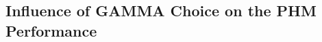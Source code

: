 \begin{comment}
\begin{figure}[H]
  \centering
  \texttt{[image: accuracy\_real\_world]}
  \caption {Source and Target Accuracies for model training with Regular FC + CNN MMD-loss (left), Regular FC MMD (middle) and No MMD-loss (right)} \label{fig:accuracy_real_world}
\end{figure}


\begin{figure}[H]
  \centering
  \texttt{[image: loss\_real\_world]}
  \caption {Loss for model training with Regular FC + CNN MMD-loss (left), Regular FC MMD (middle) and No MMD loss} \label{fig:loss_real_world}
\end{figure}


In fig. the development of the source CE and MMD-loss is shown. It can be seen, that the hyperparameter GAMMA was picked well, such that the MMD as well as the source CE-loss were able to be reduced smoothly throughout the trainings process. 


Unfortunately the MMD-loss could just minimize the domain discrepancy by a little. The domain discrepancy problem couldn't be solved completely. Still the idea of the MMD-loss becomes more clear in the experiments. Also the positive effect of the MMD-loss for the training is obvious. For the complex multi-dimensional dataset the MMD-loss is probably not sophisticated enough to detect and effectively fight the domain discrepancy.
\end{comment}

\subsection{Influence of GAMMA Choice on the PHM Performance}\label{ch:Influence_GAMMA_real_dataset}


